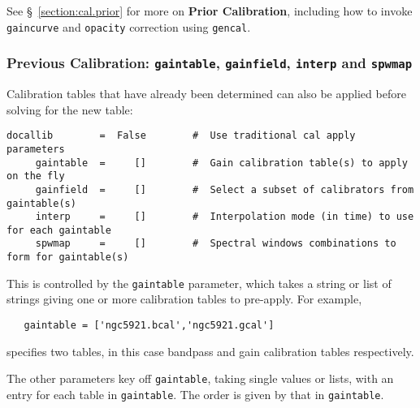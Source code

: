 See \S~\ref{section:cal.prior} for more on {\bf Prior Calibration},
including
how to invoke {\tt gaincurve} and {\tt opacity} correction using
{\tt gencal}.

\subsubsection{Previous Calibration: {\tt gaintable},
{\tt gainfield}, {\tt interp} and {\tt spwmap} }
\label{section:cal.solve.pars.previous}

Calibration tables that have already been determined can also be
applied before solving for the new table:
\small
\begin{verbatim}
docallib        =  False        #  Use traditional cal apply parameters
     gaintable  =     []        #  Gain calibration table(s) to apply on the fly
     gainfield  =     []        #  Select a subset of calibrators from gaintable(s)
     interp     =     []        #  Interpolation mode (in time) to use for each gaintable
     spwmap     =     []        #  Spectral windows combinations to form for gaintable(s)
\end{verbatim}
\normalsize


This is controlled by the {\tt gaintable} parameter, which takes 
a string or list of strings giving one or more calibration tables 
to pre-apply.  For example,

\small
\begin{verbatim}
   gaintable = ['ngc5921.bcal','ngc5921.gcal']
\end{verbatim}
\normalsize
specifies two tables, in this case bandpass and gain calibration tables
respectively.

The other parameters key off {\tt gaintable}, taking single values or
lists, with an entry for each table in {\tt gaintable}.  The order is
given by that in {\tt gaintable}.

